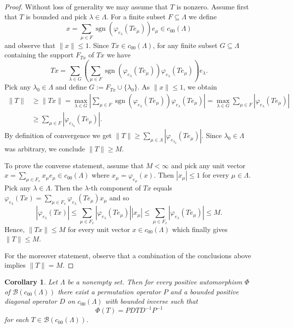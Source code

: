 \documentclass[12pt,reqno]{amsart}
\theoremstyle{plain}
\newtheorem{corollary}[theorem]{Corollary}
\theoremstyle{definition}
\DeclareMathOperator{\sgn}{sgn}
\renewcommand{\le}{\leqslant}
\renewcommand{\ge}{\geqslant}
\begin{document}
\begin{proof}
Without loss of generality we may assume that $T$ is nonzero.
Assume first that $T$ is bounded and pick $\lambda\in \Lambda$. 
For a finite subset $F\subseteq\Lambda$ we define
$$x=\sum_{\mu\in F} \sgn (\varphi_{e_\lambda}(Te_\mu))e_\mu \in c_{00}(\Lambda)$$ and observe that $\|x\|\le 1$. Since $Tx\in c_{00}(\Lambda)$, for any finite subset $G\subseteq \Lambda$ containing the support $F_{Tx}$ of $Tx$ we have
$$Tx=\sum_{\lambda\in G} \left(\sum_{\mu\in F} \sgn (\varphi_{e_\lambda}(Te_\mu))\varphi_{e_\lambda}(Te_\mu)\right)e_\lambda.$$
Pick any $\lambda_0\in \Lambda$ and define $G:=F_{Tx}\cup\{\lambda_0\}$. As $\|x\|\le 1$, we obtain
\begin{align*}
\|T\|&\geq \|Tx\|=\max_{\lambda\in G} \left |\sum_{\mu\in F} \sgn (\varphi_{e_\lambda}(Te_\mu))\varphi_{e_\lambda}(Te_\mu)\right |= \max_{\lambda\in G} \sum_{\mu\in F} |\varphi_{e_\lambda}(Te_\mu)|\\
& \geq \sum_{\mu\in F} |\varphi_{e_{\lambda_0}}(Te_\mu)|.
\end{align*}
By definition of convergence we get $\|T\|\ge \sum_{\mu\in\Lambda} |\varphi_{e_{\lambda_0}}(Te_\mu)|$. Since $\lambda_0\in \Lambda$ was arbitrary, we conclude $\|T\|\geq M$.

To prove the converse statement, assume that $M<\infty$ and pick any unit vector $x=\sum_{\mu\in F_x} x_\mu e_\mu\in c_{00}(\Lambda)$ where $x_\mu=\varphi_{e_\mu}(x)$. Then $|x_\mu|\leq 1$ for every $\mu\in\Lambda$. Pick any $\lambda\in\Lambda$. Then the $\lambda$-th component of $Tx$ equals $\varphi_{e_\lambda}(Tx)=\sum_{\mu\in F_x}\varphi_{e_\lambda}(Te_\mu) x_\mu$ and so
$$|\varphi_{e_\lambda}(Tx)|\leq \sum_{\mu \in F_x}|\varphi_{e_\lambda}(Te_\mu)||x_\mu|\leq \sum_{\mu \in F_x}|\varphi_{e_\lambda}(Te_\mu)|\leq M.$$
Hence, $\|Tx\|\leq M$ for every unit vector $x\in c_{00}(\Lambda)$ which finally gives $\|T\|\leq M$.

For the moreover statement, observe that a combination of the conclusions above implies $\|T\|=M$.
\end{proof}

\begin{corollary}\label{c00 bounded version}
Let $\Lambda$ be a nonempty set. Then for every positive automorphism $\Phi$ of $\mathscr B(c_{00}(\Lambda))$ there exist a permutation operator $P$ and a bounded positive diagonal operator $D$ on $c_{00}(\Lambda)$ with bounded inverse such that
$$\Phi(T)=PDTD^{-1}P^{-1}$$ for each $T\in \mathscr B(c_{00}(\Lambda))$.
\end{corollary}
\end{document}
